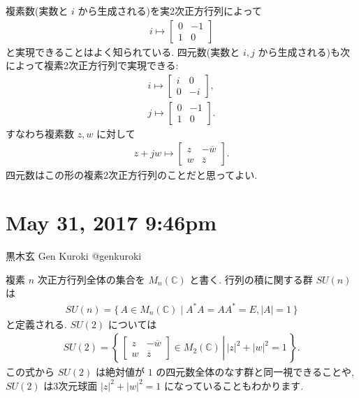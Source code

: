 \documentclass[12pt,twoside]{jarticle}
\theoremstyle{jplain}
\theoremstyle{jplain}
\theoremstyle{jplain}
\numberwithin{theorem}{section}
\numberwithin{equation}{section}
\numberwithin{figure}{section}
\numberwithin{table}{section}
\begin{document}
複素数(実数と $i$ から生成される)を実2次正方行列によって\begin{align*}i\mapsto\begin{bmatrix}0&-1\\ 1&0\end{bmatrix}\end{align*}と実現できることはよく知られている. 四元数(実数と $i,j$ から生成される)も次によって複素2次正方行列で実現できる:\begin{align*}i\mapsto\begin{bmatrix}i&0\\ 0&-i\end{bmatrix},\\ j\mapsto\begin{bmatrix}0&-1\\ 1&0\end{bmatrix}.\end{align*}すなわち複素数 $z,w$ に対して\begin{align*}z+jw\mapsto\begin{bmatrix}z&-\overline{w}\\ w&\overline{z}\end{bmatrix}.\end{align*}四元数はこの形の複素2次正方行列のことだと思ってよい. 







\section{ May 31, 2017  9:46pm}








黒木玄 Gen Kuroki
@genkuroki


複素 $n$ 次正方行列全体の集合を $M_n(\mathbb C)$ と書く. 行列の積に関する群 $SU(n)$ は\begin{align*}SU(n)=\{\, A\in M_n(\mathbb C)\mid A^*A=AA^*=E, |A|=1\,\}\end{align*}と定義される. $SU(2)$ については\begin{align*}SU(2)=\left\{\,\left.\begin{bmatrix}z&-\overline{w}\\ w&\overline{z}\end{bmatrix}\in M_2(\mathbb C)\,\right|\,|z|^2+|w|^2=1\,\right\}.\end{align*}この式から $SU(2)$ は絶対値が $1$ の四元数全体のなす群と同一視できることや, $SU(2)$ は3次元球面 $|z|^2+|w|^2=1$ になっていることもわかります. 
\end{document}
